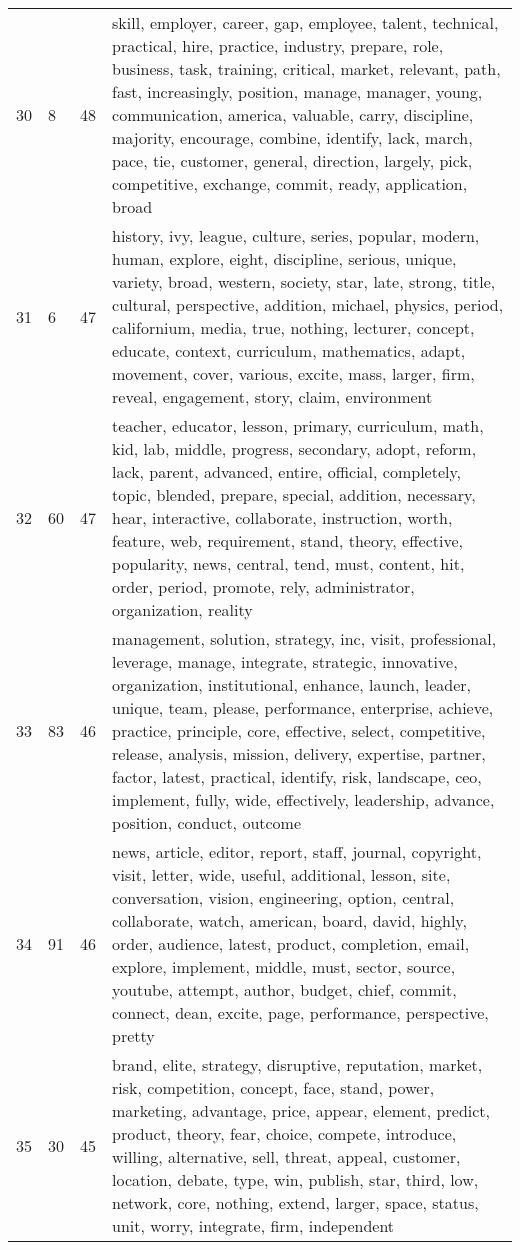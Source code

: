 \begin{table}[ht]
{\begin{tabularx}{\textwidth}{llrX}
   30 & 8 & 48 & skill, employer, career, gap, employee, talent, technical, practical, hire, practice, industry, prepare, role, business, task, training, critical, market, relevant, path, fast, increasingly, position, manage, manager, young, communication, america, valuable, carry, discipline, majority, encourage, combine, identify, lack, march, pace, tie, customer, general, direction, largely, pick, competitive, exchange, commit, ready, application, broad \\ 
   31 & 6 & 47 & history, ivy, league, culture, series, popular, modern, human, explore, eight, discipline, serious, unique, variety, broad, western, society, star, late, strong, title, cultural, perspective, addition, michael, physics, period, californium, media, true, nothing, lecturer, concept, educate, context, curriculum, mathematics, adapt, movement, cover, various, excite, mass, larger, firm, reveal, engagement, story, claim, environment \\ 
   32 & 60 & 47 & teacher, educator, lesson, primary, curriculum, math, kid, lab, middle, progress, secondary, adopt, reform, lack, parent, advanced, entire, official, completely, topic, blended, prepare, special, addition, necessary, hear, interactive, collaborate, instruction, worth, feature, web, requirement, stand, theory, effective, popularity, news, central, tend, must, content, hit, order, period, promote, rely, administrator, organization, reality \\ 
   33 & 83 & 46 & management, solution, strategy, inc, visit, professional, leverage, manage, integrate, strategic, innovative, organization, institutional, enhance, launch, leader, unique, team, please, performance, enterprise, achieve, practice, principle, core, effective, select, competitive, release, analysis, mission, delivery, expertise, partner, factor, latest, practical, identify, risk, landscape, ceo, implement, fully, wide, effectively, leadership, advance, position, conduct, outcome \\ 
   34 & 91 & 46 & news, article, editor, report, staff, journal, copyright, visit, letter, wide, useful, additional, lesson, site, conversation, vision, engineering, option, central, collaborate, watch, american, board, david, highly, order, audience, latest, product, completion, email, explore, implement, middle, must, sector, source, youtube, attempt, author, budget, chief, commit, connect, dean, excite, page, performance, perspective, pretty \\ 
   35 & 30 & 45 & brand, elite, strategy, disruptive, reputation, market, risk, competition, concept, face, stand, power, marketing, advantage, price, appear, element, predict, product, theory, fear, choice, compete, introduce, willing, alternative, sell, threat, appeal, customer, location, debate, type, win, publish, star, third, low, network, core, nothing, extend, larger, space, status, unit, worry, integrate, firm, independent \\ 

\end{tabularx}}
\end{table}
